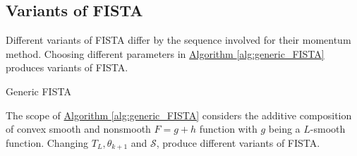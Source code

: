\documentclass[]{article}
\theoremstyle{definition}
\numberwithin{equation}{subsection}
\begin{document}
    \subsection*{Variants of FISTA}
        Different variants of FISTA differ by the sequence involved for their momentum method. 
        Choosing different parameters in \hyperref[alg:generic_FISTA]{Algorithm \ref*{alg:generic_FISTA}} produces variants of FISTA. 
        \begin{algorithm}[H]
            \begin{algorithmic}[1]
                \ENDFOR
            \end{algorithmic}
            \caption{Generic FISTA}
            \label{alg:generic_FISTA}
        \end{algorithm}
        The scope of \hyperref[alg:generic_FISTA]{Algorithm \ref*{alg:generic_FISTA}} considers the additive composition of convex smooth and nonsmooth $F = g + h$ function with $g$ being a $L$-smooth function. 
        Changing $T_L, \theta_{k + 1}$ and $\mathcal S$, produce different variants of FISTA. 
\end{document}
